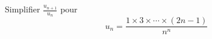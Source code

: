 Simplifier $\frac{u_{n+1}}{u_n}$ pour
\begin{displaymath}
 u_n=\frac{1\times 3 \times \cdots \times(2n-1)}{n^n}
\end{displaymath}
\bigskip  \bigskip \bigskip